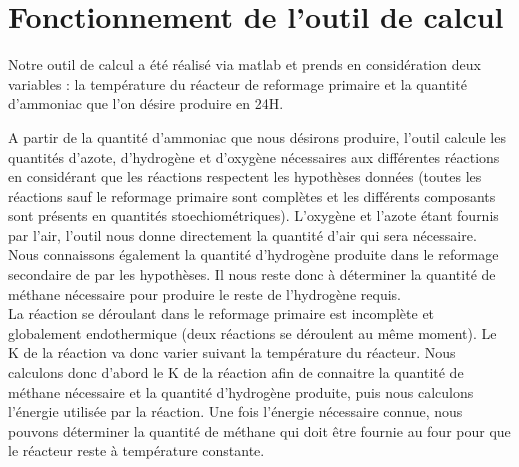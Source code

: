 \documentclass[a4paper, oneside, 12pt]{article}
\begin{document}
\section{Fonctionnement de l'outil de calcul}

Notre outil de calcul a été réalisé via matlab et prends en considération deux variables : 
la température du réacteur de reformage primaire et la quantité d'ammoniac 
que l'on désire produire en 24H. 

A partir de la quantité d'ammoniac que nous désirons 
produire, l'outil calcule les quantités d'azote, d'hydrogène et d'oxygène 
nécessaires aux différentes réactions en considérant que
les réactions respectent les hypothèses données (toutes les réactions sauf 
le reformage primaire sont complètes et les différents composants sont présents en 
quantités stoechiométriques). L'oxygène et l'azote étant fournis par l'air,
l'outil nous donne directement la quantité d'air qui sera
nécessaire. Nous connaissons également la quantité d'hydrogène produite dans 
le reformage secondaire de par les hypothèses. 
Il nous reste donc à déterminer la quantité de méthane nécessaire 
pour produire le reste de l'hydrogène requis. 
\\
La réaction se déroulant dans le reformage primaire est incomplète et 
globalement endothermique (deux réactions se déroulent au même moment).
Le K de la réaction va donc varier suivant la température du réacteur.
Nous calculons donc d'abord le K de la réaction afin de 
connaitre la quantité de méthane nécessaire et la quantité d'hydrogène produite,
puis nous calculons l'énergie utilisée par la réaction.
Une fois l'énergie nécessaire connue, nous pouvons déterminer la quantité 
de méthane qui doit être fournie au four pour que le réacteur reste à température constante.
\end{document}
